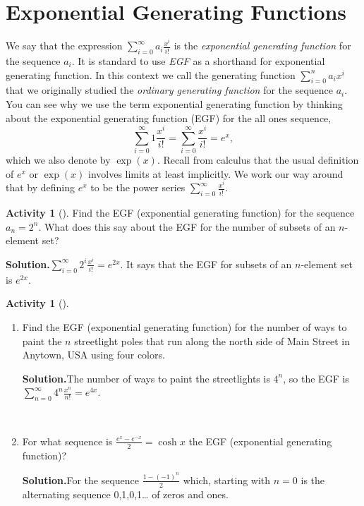 \documentclass[10pt,]{book}
\theoremstyle{plain}
\theoremstyle{definition}
\newtheorem{activity}[project]{Activity}
\numberwithin{equation}{chapter}
\begin{document}
\section[{Exponential Generating Functions}]{Exponential Generating Functions}\label{section-27}
We say that the expression \(\sum_{i=0}^\infty a_i\frac{x^i}{i!}\) is the \emph{exponential generating function} for the sequence \(a_i\). It is standard to use \emph{EGF} as a shorthand for exponential generating function. In this context we call the generating function \(\sum_{i=0}^n a_ix^i\) that we originally studied the \emph{ordinary generating function} for the sequence \(a_i\). You can see why we use the term exponential generating function by thinking about the exponential generating function (EGF) for the all ones sequence,%
\begin{equation*}
\sum_{i=0}^\infty 1\frac{x^i}{i!} = \sum_{i=0}^\infty \frac{x^i}{i!}
=e^x,
\end{equation*}
which we also denote by \(\exp (x)\). Recall from calculus that the usual definition of \(e^x\) or \(\exp(x)\) involves limits at least implicitly. We work our way around that by defining \(e^x\) to be the power series \(\sum_{i=0}^\infty
\frac{x^i}{i!}\).%
\begin{activity}[]\label{activity-351}
Find the EGF (exponential generating function) for the sequence \(a_n=2^n\). What does this say about the EGF for the number of subsets of an \(n\)-element set?%
\par\medskip\noindent%
\textbf{Solution.}\quad \(\sum_{i=0}^\infty {2^i}\frac{x^i}{i!}=e^{2x}\). It says that the EGF for subsets of an \(n\)-element set is \(e^{2x}\).%
\end{activity}
\begin{activity}[]\label{paintinglightpoles}
~\par
\begin{enumerate}[label=(\alph*)]
 \item Find the EGF (exponential generating function) for the number of ways to paint the \(n\) streetlight poles that run along the north side of Main Street in Anytown, USA using four colors.%
\par\medskip\noindent%
\textbf{Solution.}\quad The number of ways to paint the streetlights is \(4^n\), so the EGF is \(\sum_{n=0}^\infty 4^n\frac{x^n}{n!}=e^{4x}\).%

~\par
\item For what sequence is \(\frac{e^x-e^{-x}}{2} =\cosh x\) the EGF (exponential generating function)?%
\par\medskip\noindent%
\textbf{Solution.}\quad For the sequence \(\frac{1-(-1)^n}{2}\) which, starting with \(n=0\) is the alternating sequence 0,1,0,1\dots{} of zeros and ones.%

\end{enumerate}
\end{activity}
\end{document}
